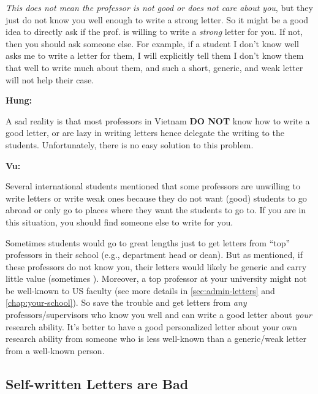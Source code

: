 \documentclass[oneside,11pt,dvipsnames]{book}
\newenvironment{commentbox}[1][]{
  \small
  \begin{mybox}
    {\small \textbf{#1}}
  }{
  \end{mybox}
}
\newcommand{\red}[1]{{\color{red}{#1}}}
\begin{document}
\emph{This does not mean the professor is not good or does not care about you}, but they just do not know you well enough to write a strong letter.
So it might be a good idea to directly ask if the prof. is willing to write a \emph{strong} letter for you. If not, then you should ask someone else.  For example, if a student I don't know well asks me to write a letter for them, I will explicitly tell them I don't know them that well to write much about them, and such a short, generic, and weak letter will not help their case.


\begin{commentbox}[Hung:]
  A sad reality is that most professors in Vietnam \textbf{DO NOT} know how to write a good letter, or are lazy in writing letters hence delegate the writing to the students. Unfortunately, there is no easy solution to this problem.
\end{commentbox}

\begin{commentbox}[Vu:]

  Several international students mentioned that some professors are unwilling to write letters or write weak ones because they do not want (good) students to go abroad or only go to places where they want the students to go to. If you are in this situation, you should find someone else to write for you.
  \tcblower

Sometimes students would go to great lengths just to get letters from ``top'' professors in their school (e.g., department head or dean). But as mentioned, if these professors do not know you, their letters would likely be generic and carry little value (sometimes \red{red flags}). Moreover, a top professor at your university might not be well-known to US faculty (see more details in \autoref{sec:admin-letters} and \autoref{chap:your-school}). So save the trouble and get letters from \emph{any} professors/supervisors who know you well and can write a good letter about \emph{your} research ability. It's better to have a good personalized letter about your own research ability from someone who is less well-known than a generic/weak letter from a well-known person.

\end{commentbox}


\subsection{Self-written Letters are Bad}\label{sec:self-letters}
\end{document}
